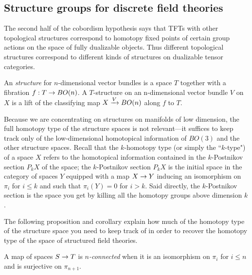 \documentclass{amsart}
\begin{document}

\subsection{Structure groups for discrete field theories}

The second half of the cobordism hypothesis says that TFTs with other topological structures correspond to homotopy fixed points of certain group actions on the space of fully dualizable objects.  Thus different topological structures correspond to different kinds of structures on dualizable tensor categories.

\begin{definition}
An \emph{structure} for $n$-dimensional vector bundles is a space $T$ together with a fibration $f: T \rightarrow BO(n)$.  A $T$-structure on an n-dimensional vector bundle $V$ on $X$ is a lift of the classifying map $X \xrightarrow{V} BO(n)$ along $f$ to $T$.
\end{definition}

Because we are concentrating on structures on manifolds of low dimension, the full homotopy type of the structure spaces is not relevant---it suffices to keep track only of the low-dimensional homotopical information of $BO(3)$ and the other structure spaces.  Recall that the $k$-homotopy type (or simply the ``$k$-type") of a space $X$ refers to the homotopical information contained in the $k$-Postnikov section $P_k X$ of the space; the $k$-Postnikov section $P_k X$ is the initial space in the category of spaces $Y$ equipped with a map $X \rightarrow Y$ inducing an isomorphism on $\pi_i$ for $i \leq k$ and such that $\pi_i(Y) = 0$ for $i > k$. Said directly, the $k$-Postnikov section is the space you get by killing all the homotopy groups above dimension $k$. %

The following proposition and corollary explain how much of the homotopy type of the structure space you need to keep track of in order to recover the homotopy type of the space of structured field theories.

\begin{definition}[$n$-Connected]
A map of spaces $S \rightarrow T$ is \emph{$n$-connected} when it is an isomorphism on $\pi_i$ for $i \leq n$ and is surjective on $\pi_{n+1}$.
\end{definition}
\end{document}
